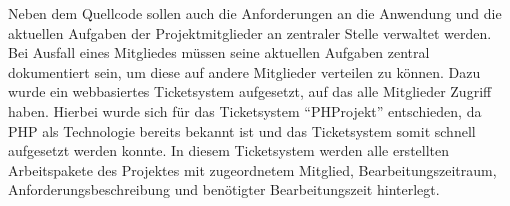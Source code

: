 
Neben dem Quellcode sollen auch die Anforderungen an die Anwendung und die
aktuellen Aufgaben der Projektmitglieder an zentraler Stelle verwaltet werden.
Bei Ausfall eines Mitgliedes müssen seine aktuellen Aufgaben zentral
dokumentiert sein, um diese auf andere Mitglieder verteilen zu können. Dazu
wurde ein webbasiertes Ticketsystem aufgesetzt, auf das alle Mitglieder Zugriff
haben. Hierbei wurde sich für das Ticketsystem "`PHProjekt"' entschieden, da PHP
als Technologie bereits bekannt ist und das Ticketsystem somit schnell
aufgesetzt werden konnte. In diesem Ticketsystem werden alle erstellten
Arbeitspakete des Projektes mit zugeordnetem Mitglied, Bearbeitungszeitraum,
Anforderungsbeschreibung und benötigter Bearbeitungszeit hinterlegt.